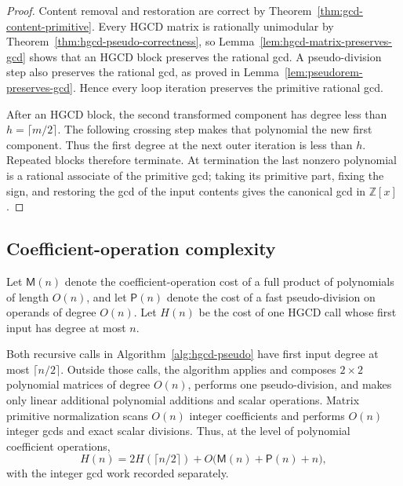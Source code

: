 \documentclass[11pt]{book}
\theoremstyle{definition}
\newcommand{\ZZ}{\mathbb Z}
\begin{document}
\begin{proof}
Content removal and restoration are correct by
Theorem~\ref{thm:gcd-content-primitive}.  Every HGCD matrix is rationally
unimodular by Theorem~\ref{thm:hgcd-pseudo-correctness}, so
Lemma~\ref{lem:hgcd-matrix-preserves-gcd} shows that an HGCD block preserves
the rational gcd.  A pseudo-division step also preserves the rational gcd,
as proved in Lemma~\ref{lem:pseudorem-preserves-gcd}.  Hence every loop
iteration preserves the primitive rational gcd.

After an HGCD block, the second transformed component has degree less than
$h=\lceil m/2\rceil$.  The following crossing step makes that polynomial the
new first component.  Thus the first degree at the next outer iteration is
less than $h$.  Repeated blocks therefore terminate.  At termination the last
nonzero polynomial is a rational associate of the primitive gcd; taking its
primitive part, fixing the sign, and restoring the gcd of the input contents
gives the canonical gcd in $\ZZ[x]$.
\end{proof}

\subsection{Coefficient-operation complexity}

Let $\mathsf M(n)$ denote the coefficient-operation cost of a full product of
polynomials of length $O(n)$, and let $\mathsf P(n)$ denote the cost of a fast
pseudo-division on operands of degree $O(n)$.  Let $H(n)$ be the cost of one
HGCD call whose first input has degree at most $n$.

Both recursive calls in Algorithm~\ref{alg:hgcd-pseudo} have first input
degree at most $\lceil n/2\rceil$.  Outside those calls, the algorithm applies
and composes $2\times2$ polynomial matrices of degree $O(n)$, performs one
pseudo-division, and makes only linear additional polynomial additions and
scalar operations.  Matrix primitive normalization scans $O(n)$ integer
coefficients and performs $O(n)$ integer gcds and exact scalar divisions.
Thus, at the level of polynomial coefficient operations,
\begin{equation}\label{eq:hgcd-recurrence}
 H(n)
 =2H(\lceil n/2\rceil)
  +O\bigl(\mathsf M(n)+\mathsf P(n)+n\bigr),
\end{equation}
with the integer gcd work recorded separately.
\end{document}
